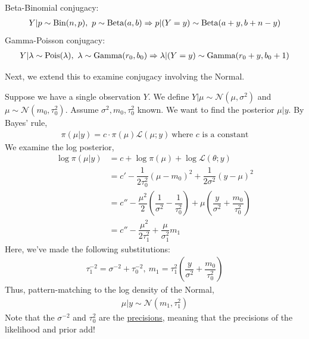 \documentclass[12pt]{article}
\newcommand{\Bin}{\textnormal{Bin}}
\newcommand{\Pois}{\textnormal{Pois}}
\newcommand{\N}{\mathcal{N}}
\begin{document}
\medskip

\begin{tcolorbox}[breakable, title = \textbf{Example}: Beta-Binomial and Gamma-Poisson conjugacy]
    Beta-Binomial conjugacy:
    \begin{align*}
        Y|p \sim \Bin(n,p), \ p \sim \text{Beta}(a,b) \Rightarrow p|(Y=y) \sim \text{Beta}(a+y, b+n-y)
    \end{align*}
    Gamma-Poisson conjugacy:
    \begin{align*}
        Y|\lambda\sim \Pois(\lambda), \ \lambda \sim \text{Gamma}(r_0, b_0) \Rightarrow \lambda|(Y=y) \sim \text{Gamma}(r_0+y, b_0+1)
    \end{align*}
\end{tcolorbox}

\medskip

\noindent Next, we extend this to examine conjugacy involving the Normal.

\medskip

\begin{tcolorbox}[breakable, title = \textbf{Example 9.5.4 in textbook}: Normal-Normal conjugacy (single observation)]
    Suppose we have a single observation $Y$. We define $Y|\mu\sim \N(\mu,\sigma^2)$ and $\mu \sim \N(m_0, \tau_0^2)$. Assume $\sigma^2, m_0, \tau_0^2$ known. We want to find the posterior $\mu|y$. By Bayes' rule,
    \begin{align*}
        \pi(\mu|y) = c\cdot \pi(\mu)\mathcal{L}(\mu;y) \ \text{where $c$ is a constant}
    \end{align*}
    We examine the log posterior,
    \begin{align*}
        \log \pi(\mu|y) 
        &= c + \log \pi(\mu) + \log \mathcal{L}(\theta;y)\\
        &= c'-\dfrac{1}{2\tau_0^2}(\mu-m_0)^2 + \dfrac{1}{2\sigma^2}(y-\mu)^2\\
        &= c'' -\dfrac{\mu^2}{2}\left(\dfrac{1}{\sigma^2}-\dfrac{1}{\tau_0^2}\right) + \mu\left(\dfrac{y}{\sigma^2} + \dfrac{m_0}{\tau_0^2}\right)\\
        &= c'' - \dfrac{\mu^2}{2\tau_1^2}+\dfrac{\mu}{\sigma_1^2}m_1
        \end{align*}
        Here, we've made the following substitutions:
        \begin{align*}
            \tau_1^{-2} = \sigma^{-2} + \tau_0^{-2}, \ m_1 = \tau_1^2\left(\dfrac{y}{\sigma^2} + \dfrac{m_0}{\tau_0^2}\right)
        \end{align*}
        Thus, pattern-matching to the log density of the Normal,
        \begin{align*}
            \boxed{\mu|y \sim \N(m_1,\tau_1^2)}
        \end{align*}
        Note that the $\sigma^{-2}$ and $\tau_0^2$ are the \underline{precisions}, meaning that the precisions of the likelihood and prior add!
\end{tcolorbox}
\end{document}
